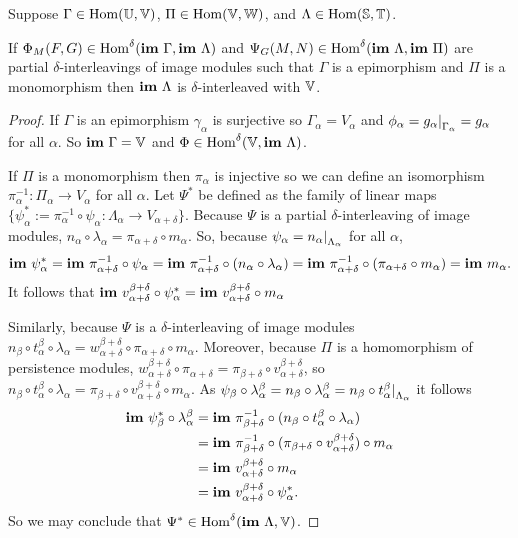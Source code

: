 \begin{lemma}\label{thm:interleaving_main}
  Suppose $\Gamma\in\mathrm{Hom}(\mathbb{U},\mathbb{V})$, $\Pi\in\mathrm{Hom}(\mathbb{V},\mathbb{W})$, and $\Lambda\in\mathrm{Hom}(\mathbb{S}, \mathbb{T})$.

  If $\Phi_M(F, G)\in\mathrm{Hom}^\delta(\mathbf{im}~\Gamma, \mathbf{im}~\Lambda)$ and $\Psi_G(M, N)\in\mathrm{Hom}^\delta(\mathbf{im}~\Lambda, \mathbf{im}~\Pi)$ are partial $\delta$-interleavings of image modules such that $\Gamma$ is a epimorphism and $\Pi$ is a monomorphism then $\mathbf{im}~\Lambda$ is $\delta$-interleaved with $\mathbb{V}$.
\end{lemma}
\begin{proof}
  If $\Gamma$ is an epimorphism $\gamma_\alpha$ is surjective so $\Gamma_\alpha = V_\alpha$ and $\phi_{\alpha} = g_{\alpha}\mathord{\mid}_{\Gamma_\alpha} = g_\alpha$ for all $\alpha$.
  So $\mathbf{im}~\Gamma = \mathbb{V}$ and $\Phi\in\mathrm{Hom}^\delta(\mathbb{V},\mathbf{im}~\Lambda)$.

  If $\Pi$ is a monomorphism then $\pi_\alpha$ is injective so we can define an isomorphism $\pi_\alpha^{-1} : \Pi_\alpha\to V_\alpha$ for all $\alpha$.
  Let $\Psi^*$ be defined as the family of linear maps $\{\psi_\alpha^* := \pi^{-1}_\alpha \circ \psi_\alpha : \Lambda_\alpha\to V_{\alpha+\delta}\}$.
  Because $\Psi$ is a partial $\delta$-interleaving of image modules, $n_\alpha\circ\lambda_\alpha = \pi_{\alpha+\delta}\circ m_\alpha$.
  So, because $\psi_\alpha = n_\alpha\mathord{\mid}_{\Lambda_\alpha}$ for all $\alpha$,
  \begin{align*}
    \mathbf{im}~\psi_\alpha^* = \mathbf{im}~\pi^{-1}_{\alpha+\delta}\circ\psi_\alpha = \mathbf{im}~\pi^{-1}_{\alpha+\delta}\circ (n_\alpha\circ\lambda_\alpha) = \mathbf{im}~\pi^{-1}_{\alpha+\delta}\circ (\pi_{\alpha+\delta}\circ m_\alpha) = \mathbf{im}~ m_\alpha.
  \end{align*}
  It follows that $\mathbf{im}~v_{\alpha+\delta}^{\beta+\delta}\circ\psi_\alpha^* = \mathbf{im}~v_{\alpha+\delta}^{\beta+\delta}\circ m_\alpha$

  Similarly, because $\Psi$ is a $\delta$-interleaving of image modules $n_\beta\circ t_\alpha^\beta\circ \lambda_\alpha = w_{\alpha+\delta}^{\beta+\delta}\circ\pi_{\alpha+\delta}\circ m_\alpha$.
  Moreover, because $\Pi$ is a homomorphism of persistence modules, $w_{\alpha+\delta}^{\beta+\delta}\circ\pi_{\alpha+\delta} = \pi_{\beta+\delta}\circ v_{\alpha+\delta}^{\beta+\delta}$, so $n_\beta\circ t_\alpha^\beta\circ \lambda_\alpha = \pi_{\beta+\delta}\circ v_{\alpha+\delta}^{\beta+\delta}\circ m_\alpha.$
  As $\psi_\beta\circ\lambda_\alpha^\beta = n_\beta\circ\lambda_\alpha^\beta = n_\beta\circ t_\alpha^\beta\mathord{\mid}_{\Lambda_\alpha}$ it follows
  \begin{align*}
    \mathbf{im}~\psi_\beta^*\circ\lambda_\alpha^\beta &= \mathbf{im}~\pi^{-1}_{\beta+\delta}\circ (n_\beta\circ t_\alpha^\beta\circ\lambda_\alpha)\\
      &= \mathbf{im}~\pi^{-1}_{\beta+\delta}\circ (\pi_{\beta+\delta}\circ v_{\alpha+\delta}^{\beta+\delta})\circ m_\alpha\\
      &= \mathbf{im}~v_{\alpha+\delta}^{\beta+\delta}\circ m_\alpha\\
      &= \mathbf{im}~v_{\alpha+\delta}^{\beta+\delta}\circ\psi_\alpha^*.
  \end{align*}
  So we may conclude that $\Psi^*\in\mathrm{Hom}^\delta(\mathbf{im}~\Lambda,\mathbb{V})$.


\end{proof}
